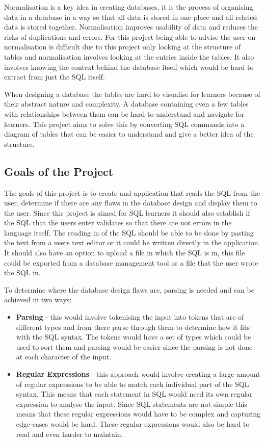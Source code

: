 Normalisation is a key idea in creating databases, it is the process of organising data in a database in a way so that all data is stored in one place and all related data is stored together\cite{normalisation}. Normalisation improves usability of data and reduces the risks of duplications and errors. For this project being able to advise the user on normalisation is difficult due to this project only looking at the structure of tables and normalisation involves looking at the entries inside the tables. It also involves knowing the context behind the database itself which would be hard to extract from just the SQL itself.

When designing a database the tables are hard to visualise for learners because of their abstract nature and complexity. A database containing even a few tables with relationships between them can be hard to understand and navigate for learners. This project aims to solve this by converting SQL commands into a diagram of tables that can be easier to understand and give a better idea of the structure.

\subsection{Goals of the Project}

The goals of this project is to create and application that reads the SQL from the user, determine if there are any flaws in the database design and display them to the user. Since this project is aimed for SQL learners it should also establish if the SQL that the users enter validates so that there are not errors in the language itself. The reading in of the SQL should be able to be done by pasting the text from a users text editor or it could be written directly in the application. It should also have an option to upload a file in which the SQL is in, this file could be exported from a database management tool or a file that the user wrote the SQL in.

To determine where the database design flaws are, parsing is needed and can be achieved in two ways:

\begin{itemize}
	\item \textbf{Parsing} - this would involve tokenising the input into tokens that are of different types and from there parse through them to determine how it fits with the SQL syntax. The tokens would have a set of types which could be used to sort them and parsing would be easier since the parsing is not done at each character of the input.
	
	\item \textbf{Regular Expressions} - this approach would involve creating a large amount of regular expressions to be able to match each individual part of the SQL syntax. This means that each statement in SQL would need its own regular expression to analyse the input. Since SQL statements are not simple this means that these regular expressions would have to be complex and capturing edge-cases would be hard. These regular expressions would also be hard to read and even harder to maintain.
\end{itemize}

